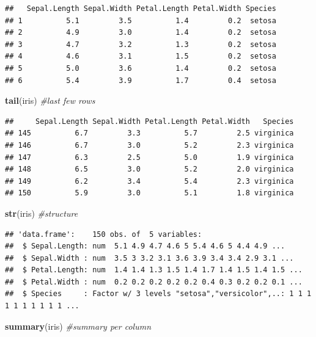\documentclass[
]{book}
\newenvironment{Shaded}{\begin{snugshade}}{\end{snugshade}}
\newcommand{\CommentTok}[1]{\textcolor[rgb]{0.56,0.35,0.01}{\textit{#1}}}
\newcommand{\FunctionTok}[1]{\textcolor[rgb]{0.13,0.29,0.53}{\textbf{#1}}}
\newcommand{\NormalTok}[1]{#1}
\begin{document}
\begin{verbatim}
##   Sepal.Length Sepal.Width Petal.Length Petal.Width Species
## 1          5.1         3.5          1.4         0.2  setosa
## 2          4.9         3.0          1.4         0.2  setosa
## 3          4.7         3.2          1.3         0.2  setosa
## 4          4.6         3.1          1.5         0.2  setosa
## 5          5.0         3.6          1.4         0.2  setosa
## 6          5.4         3.9          1.7         0.4  setosa
\end{verbatim}

\begin{Shaded}
\begin{Highlighting}[]
\FunctionTok{tail}\NormalTok{(iris) }\CommentTok{\#last few rows}
\end{Highlighting}
\end{Shaded}

\begin{verbatim}
##     Sepal.Length Sepal.Width Petal.Length Petal.Width   Species
## 145          6.7         3.3          5.7         2.5 virginica
## 146          6.7         3.0          5.2         2.3 virginica
## 147          6.3         2.5          5.0         1.9 virginica
## 148          6.5         3.0          5.2         2.0 virginica
## 149          6.2         3.4          5.4         2.3 virginica
## 150          5.9         3.0          5.1         1.8 virginica
\end{verbatim}

\begin{Shaded}
\begin{Highlighting}[]
\FunctionTok{str}\NormalTok{(iris) }\CommentTok{\#structure}
\end{Highlighting}
\end{Shaded}

\begin{verbatim}
## 'data.frame':    150 obs. of  5 variables:
##  $ Sepal.Length: num  5.1 4.9 4.7 4.6 5 5.4 4.6 5 4.4 4.9 ...
##  $ Sepal.Width : num  3.5 3 3.2 3.1 3.6 3.9 3.4 3.4 2.9 3.1 ...
##  $ Petal.Length: num  1.4 1.4 1.3 1.5 1.4 1.7 1.4 1.5 1.4 1.5 ...
##  $ Petal.Width : num  0.2 0.2 0.2 0.2 0.2 0.4 0.3 0.2 0.2 0.1 ...
##  $ Species     : Factor w/ 3 levels "setosa","versicolor",..: 1 1 1 1 1 1 1 1 1 1 ...
\end{verbatim}

\begin{Shaded}
\begin{Highlighting}[]
\FunctionTok{summary}\NormalTok{(iris) }\CommentTok{\#summary per column}
\end{Highlighting}
\end{Shaded}
\end{document}
